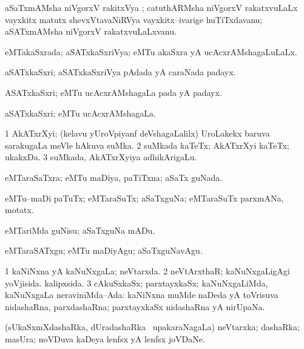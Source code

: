 \bentry
{}
\gl{\nA}
\bmng
aSaTxmAMsha niVgorxV rakitxVya ; catuthARMsha niVgorxV rakatxvuLaLx vayxkitx matutx shevxVtavaNiRVya vayxkitx--ivarige huTiTxdavanu; aSATxmAMsha niVgorxV rakatxvuLaLxvanu. 
\emng
\eentry

\bentry
{}
\gl{\gu}
\bmng
eMTakaSxrada; aSATxkaSxriVya; eMTu akaSxra yA ucAcxrAMshagaLuLaLx. 
\emng
\eentry

\bentry
{}
\gl{\nA}
\bmng
aSATxkaSxri; aSATxkaSxriVya pAdada yA caraNada padayx. 
\emng
\eentry

\bentry
{}
\gl{\gu}
\bmng
ASATxkaSxri; eMTu ucAcxrAMshagaLa pada yA padayx. 
\emng
\eentry

\bentry
{}
\gl{\gu}
\bmng
aSATxkaSxri; eMTu ucAcxrAMshagaLa. 
\emng
\eentry

\bentry
{}
\gl{\nA}
\bmng
\bnum
\num{1} AkATxrXyi; (kelavu yUroVpiyanf deVshagaLalilx) UroLakekx baruva sarakugaLa meVle hAkuva suMka. 
\num{2} suMkada kaTeTx; AkATxrXyi kaTeTx; ukakxDa. 
\num{3} suMkada, AkATxrXyiya adhikArigaLu. 
\enum
\emng
\eentry

\bentry
{}
\gl{\gu}
\bmng
eMTaraSaTxra; eMTu maDiya, paTiTxna; aSaTx guNada. 
\emng
\eentry

\bentry
{}
\gl{\nA}
\bmng
eMTu--maDi paTuTx; eMTaraSuTx; aSaTxguNa; eMTaraSuTx parxmANa, motatx. 
\emng
\eentry

\bentry
{}
\gl{\sakirx}
\bmng
eMTariMda guNisu; aSaTxguNa mADu. 
\emng

\noindent
\gl{\akirx}
\bmng
eMTaraSATxgu; eMTu maDiyAgu; aSaTxguNavAgu. 
\emng
\eentry

\bentry
{}
\gl{\gu}
\bmng
\bnum
\num{1} kaNiNxna yA kaNuNxgaLa; neVtarxda. 
\num{2} neVtArxthaR; kaNuNxgaLigAgi yoVjisida. kalipxsida. 
\num{3} cAkuSxkaSx; parxtayxkaSx; kaNuNxgaLiMda, kaNuNxgaLa neraviniMda--Ada:  kaNiNxna muMde naDeda yA toVrisuva nidashaRna, parxdashaRna; parxtayxkaSx nidashaRna yA nirUpaNa. 
\enum
\emng
\eentry

\bentry
{}
\gl{\nA}
\bmng
(sUkaSxmXdashaRka, dUradashaRka \mo\ upakaraNagaLa) neVtarxka; dashaRka; masUra; noVDuva kaDeya lenfsx yA lenfsx joVDaNe. 
\emng
\eentry

